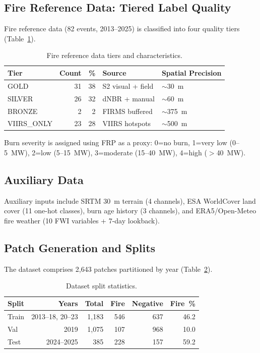 \documentclass[review,12pt]{elsarticle}
\begin{document}
\subsection{Fire Reference Data: Tiered Label Quality}

Fire reference data (82 events, 2013--2025) is classified into four quality tiers (Table~\ref{tab:tiers}).

\begin{table}[htbp]
  \centering
  \caption{Fire reference data tiers and characteristics.}
  \label{tab:tiers}
  \begin{tabular}{lrrll}
    \toprule
    Tier & Count & \% & Source & Spatial Precision \\
    \midrule
    GOLD & 31 & 38 & S2 visual + field & $\sim$30~m \\
    SILVER & 26 & 32 & dNBR + manual & $\sim$60~m \\
    BRONZE & 2 & 2 & FIRMS buffered & $\sim$375~m \\
    VIIRS\_ONLY & 23 & 28 & VIIRS hotspots & $\sim$500~m \\
    \bottomrule
  \end{tabular}
\end{table}

Burn severity is assigned using FRP as a proxy: 0=no burn, 1=very low (0--5~MW), 2=low (5--15~MW), 3=moderate (15--40~MW), 4=high ($>$40~MW).

\subsection{Auxiliary Data}

Auxiliary inputs include SRTM 30~m terrain (4 channels), ESA WorldCover land cover (11 one-hot classes), burn age history (3 channels), and ERA5/Open-Meteo fire weather (10 FWI variables + 7-day lookback).

\subsection{Patch Generation and Splits}

The dataset comprises 2,643 patches partitioned by year (Table~\ref{tab:splits}).

\begin{table}[htbp]
  \centering
  \caption{Dataset split statistics.}
  \label{tab:splits}
  \begin{tabular}{lrrrrr}
    \toprule
    Split & Years & Total & Fire & Negative & Fire~\% \\
    \midrule
    Train & 2013--18, 20--23 & 1,183 & 546 & 637 & 46.2 \\
    Val & 2019 & 1,075 & 107 & 968 & 10.0 \\
    Test & 2024--2025 & 385 & 228 & 157 & 59.2 \\
    \bottomrule
  \end{tabular}
\end{table}
\end{document}
